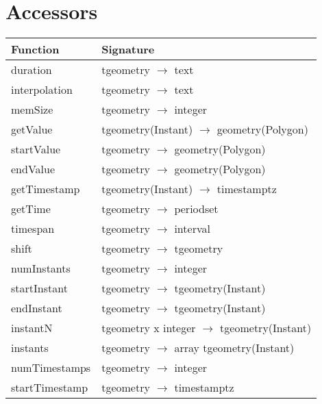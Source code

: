 \label{appendix:complete_funct_tables}

\section{Accessors}

\begin{table}[h!]
    \centering
    \begin{tabularx}{\textwidth}{|l|X|}
    \hline
    \textbf{Function}   & \textbf{Signature} \\ 
    \hline
    duration            & tgeometry $\rightarrow$ text\\
    \hline
    interpolation       & tgeometry $\rightarrow$ text\\
    \hline
    memSize             & tgeometry $\rightarrow$ integer \\
    \hline
    getValue            & tgeometry(Instant) $\rightarrow$ geometry(Polygon) \\
    \hline
    startValue          & tgeometry $\rightarrow$ geometry(Polygon) \\
    \hline
    endValue            & tgeometry $\rightarrow$ geometry(Polygon) \\
    \hline
    getTimestamp        & tgeometry(Instant) $\rightarrow$ timestamptz \\
    \hline
    getTime             & tgeometry $\rightarrow$ periodset \\
    \hline
    timespan            & tgeometry $\rightarrow$ interval \\
    \hline
    shift               & tgeometry $\rightarrow$ tgeometry \\
    \hline
    numInstants         & tgeometry $\rightarrow$ integer \\
    \hline
    startInstant        & tgeometry $\rightarrow$ tgeometry(Instant) \\
    \hline
    endInstant          & tgeometry $\rightarrow$ tgeometry(Instant) \\
    \hline
    instantN            & tgeometry x integer $\rightarrow$ tgeometry(Instant) \\
    \hline
    instants            & tgeometry $\rightarrow$ array tgeometry(Instant) \\
    \hline
    numTimestamps       & tgeometry $\rightarrow$ integer \\
    \hline
    startTimestamp      & tgeometry $\rightarrow$ timestamptz \\
    \hline

\end{tabularx}
\end{table}
